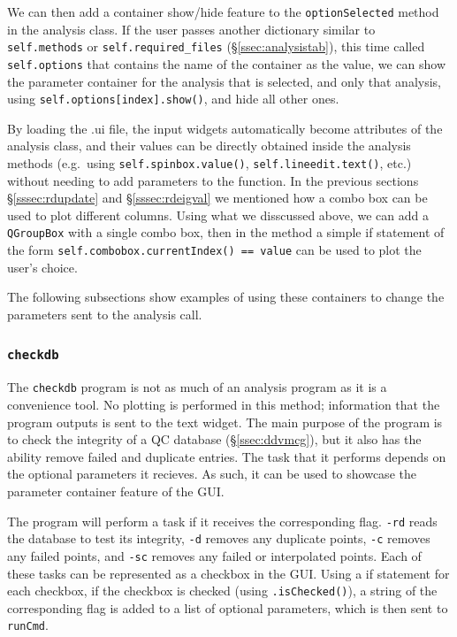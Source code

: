 \documentclass[12pt]{article}
\begin{document}
We can then add a container show/hide feature to the \texttt{optionSelected} method in the analysis class. If the user passes another dictionary similar to \texttt{self.methods} or \texttt{self.required_files} (\S\ref{ssec:analysistab}), this time called \texttt{self.options} that contains the name of the container as the value, we can show the parameter container for the analysis that is selected, and only that analysis, using \texttt{self.options[index].show()}, and hide all other ones.

By loading the .ui file, the input widgets automatically become attributes of the analysis class, and their values can be directly obtained inside the analysis methods (e.g.~using \texttt{self.spinbox.value()}, \texttt{self.lineedit.text()}, etc.) without needing to add parameters to the function. In the previous sections \S\ref{sssec:rdupdate} and \S\ref{sssec:rdeigval} we mentioned how a combo box can be used to plot different columns. Using what we disscussed above, we can add a \texttt{QGroupBox} with a single combo box, then in the method a simple if statement of the form \texttt{self.combobox.currentIndex() == value} can be used to plot the user's choice.

The following subsections show examples of using these containers to change the parameters sent to the analysis call.

\subsubsection{\texttt{checkdb}}\label{sssec:checkdb}

The \texttt{checkdb} program is not as much of an analysis program as it is a convenience tool. No plotting is performed in this method; information that the program outputs is sent to the text widget. The main purpose of the program is to check the integrity of a QC database (\S\ref{ssec:ddvmcg}), but it also has the ability remove failed and duplicate entries. The task that it performs depends on the optional parameters it recieves. As such, it can be used to showcase the parameter container feature of the GUI.

The program will perform a task if it receives the corresponding flag. \texttt{-rd} reads the database to test its integrity, \texttt{-d} removes any duplicate points, \texttt{-c} removes any failed points, and \texttt{-sc} removes any failed or interpolated points. Each of these tasks can be represented as a checkbox in the GUI. Using a if statement for each checkbox, if the checkbox is checked (using \texttt{.isChecked()}), a string of the corresponding flag is added to a list of optional parameters, which is then sent to \texttt{runCmd}.
\end{document}
